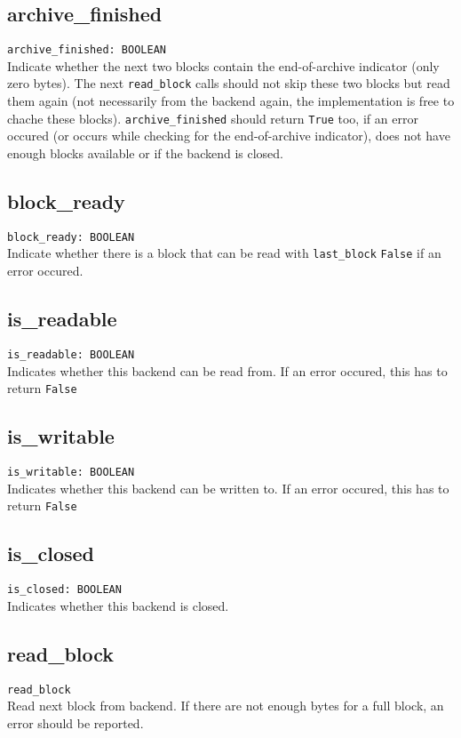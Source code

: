 \subsection{archive\_finished}
\lstinline;archive_finished: BOOLEAN;\\
Indicate whether the next two blocks contain the end-of-archive indicator
(only zero bytes). The next \lstinline;read_block; calls should not skip these
two blocks but read them again (not necessarily from the backend again, the
implementation is free to chache these blocks).
\lstinline;archive_finished; should return \lstinline;True; too, if an error
occured (or occurs while checking for the end-of-archive indicator), does not
have enough blocks available or if the backend is closed.

\subsection{block\_ready}
\lstinline;block_ready: BOOLEAN;\\
Indicate whether there is a block that can be read with \lstinline;last_block;
\lstinline;False; if an error occured.


\subsection{is\_readable}
\lstinline;is_readable: BOOLEAN;\\
Indicates whether this backend can be read from. If an error occured, this has
to return \lstinline;False;

\subsection{is\_writable}
\lstinline;is_writable: BOOLEAN;\\
Indicates whether this backend can be written to. If an error occured, this has
to return \lstinline;False;

\subsection{is\_closed}
\lstinline;is_closed: BOOLEAN;\\
Indicates whether this backend is closed.

\subsection{read\_block}
\lstinline;read_block;\\
Read next block from backend. If there are not enough bytes for a full block, an
error should be reported.

